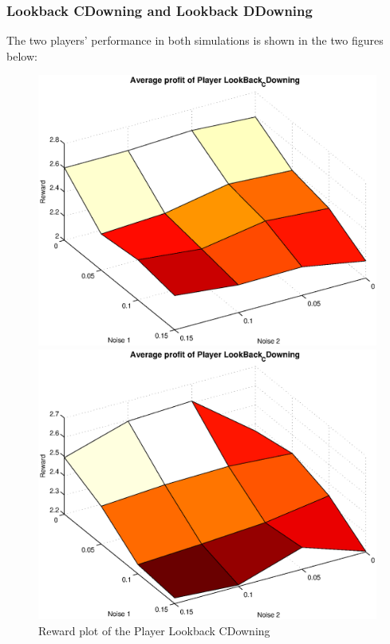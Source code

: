 \subsubsection{Lookback CDowning and Lookback DDowning}
The two players' performance in both simulations is shown in the two figures below:
\begin{figure}[h]

\begin{minipage}[hbt]{0.65\textwidth}
	\centering
	\includegraphics[width=\textwidth]{pics/simulation1/Reward_vs_Noise_of_Player_LookBack_CDowning}
\end{minipage}
\hfill
\begin{minipage}[hbt]{0.3\textwidth}
	\centering
	\includegraphics[width=\textwidth]{pics/simulation2/Reward_vs_Noise_of_Player_LookBack_CDowning}
\end{minipage}
	\caption{Reward plot of the Player Lookback CDowning}
	\label{pic player lbcd}
\end{figure}

